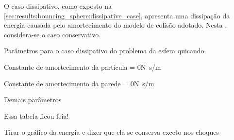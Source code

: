O caso dissipativo, como exposto na \cref{sec:results:bouncing_sphere:dissipative_case}, apresenta uma dissipação da energia causada pelo amortecimento do modelo de colisão adotado. Nesta , considera-se o caso conservativo.

\begin{table}[h]
\centering
\caption{Parâmetros para o caso dissipativo do problema da esfera quicando.}
\label{tab:bouncing_sphere:conservative:parameters}
\begin{parametersdesc}
	\item{Constante de amortecimento da partícula}{\ind{\normalDampingConstant}{\particle} = 0}{\si[per-mode=symbol]{\newton\second\per\meter}}
	\item{Constante de amortecimento da parede}{\ind{\normalDampingConstant}{\element} = 0}{\si[per-mode=symbol]{\newton\second\per\meter}}
	\item{Demais parâmetros}{}{}
\end{parametersdesc}
\sourceMe 
\end{table}
\alert{Essa tabela ficou feia!}

\alert{Tirar o gráfico da energia e dizer que ela se conserva exceto nos choques}

